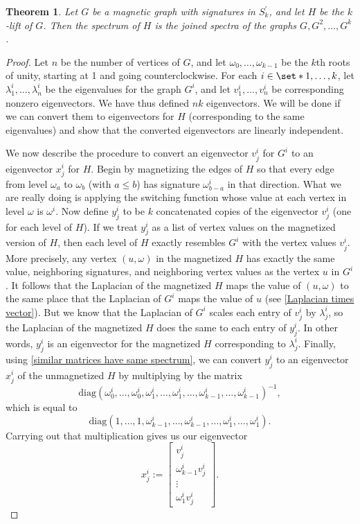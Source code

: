\documentclass[12pt]{article}
\newtheorem{thm}{Theorem}
\theoremstyle{definition}
\begin{document}
\begin{thm}
Let $G$ be a magnetic graph with signatures in $S^\prime_k$, and let $H$ be the $k$-lift of $G$. Then the spectrum of $H$ is the joined spectra of the graphs $G, G^2, \dots, G^k$. 
\end{thm}
\begin{proof}
Let $n$ be the number of vertices of $G$, and let $\omega_0, \dots, \omega_{k-1}$ be the $k$th roots of unity, starting at 1 and going counterclockwise. For each $i \in \set*{1, \dots, k}$, let $\lambda^i_1, \dots, \lambda^i_n$ be the eigenvalues for the graph $G^i$, and let $v^i_1, \dots, v^i_n$ be corresponding nonzero eigenvectors. We have thus defined $nk$ eigenvectors. We will be done if we can convert them to eigenvectors for $H$ (corresponding to the same eigenvalues) and show that the converted eigenvectors are linearly independent.

We now describe the procedure to convert an eigenvector $v^i_{j}$ for $G^i$ to an eigenvector $x^i_{j}$ for $H$. Begin by magnetizing the edges of $H$ so that every edge from level $\omega_a$ to $\omega_b$ (with $a \leq b$) has signature $\omega_{b-a}^i$ in that direction. What we are really doing is applying the switching function whose value at each vertex in level $\omega$ is $\omega^i$. Now define $y^i_j$ to be $k$ concatenated copies of the eigenvector $v^i_j$ (one for each level of $H$). If we treat $y^i_j$ as a list of vertex values on the magnetized version of $H$, then each level of $H$ exactly resembles $G^i$ with the vertex values $v^i_j$. More precisely, any vertex $(u, \omega)$ in the magnetized $H$ has exactly the same value, neighboring signatures, and neighboring vertex values as the vertex $u$ in $G^i$. It follows that the Laplacian of the magnetized $H$ maps the value of $(u, \omega)$ to the same place that the Laplacian of $G^i$ maps the value of $u$ (see \cref{Laplacian times vector}). But we know that the Laplacian of $G^i$ scales each entry of $v^i_j$ by $\lambda^i_j$, so the Laplacian of the magnetized $H$ does the same to each entry of $y^i_j$. In other words, $y^i_j$ is an eigenvector for the magnetized $H$ corresponding to $\lambda^i_j$. Finally, using \cref{similar matrices have same spectrum}, we can convert $y^i_j$ to an eigenvector $x^i_j$ of the unmagnetized $H$ by multiplying by the matrix
$$
\text{diag}(\omega_0^i, \dots, \omega_0^i, \omega_1^i, \dots, \omega_1^i, \dots, \omega_{k-1}^i, \dots, \omega_{k-1}^i)^{-1},
$$
which is equal to
$$
\text{diag}(1, \dots, 1, \omega_{k-1}^i, \dots, \omega_{k-1}^i, \dots, \omega_{1}^i, \dots, \omega_{1}^i).
$$
Carrying out that multiplication gives us our eigenvector 
$$
x_j^i := \begin{bmatrix}
           v_j^i \\
           \omega_{k-1}^i v_j^i \\
           \vdots \\
           \omega_{1}^i v_j^i
         \end{bmatrix}.
$$


\end{proof}
\end{document}
